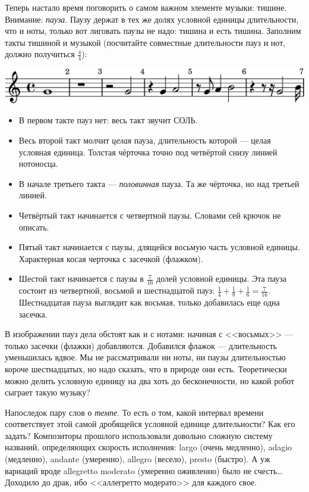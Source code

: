 Теперь настало время поговорить о самом важном элементе музыки: тишине. Внимание: \emph{пауза}. Паузу держат в тех же долях условной единицы длительности, что и ноты, только вот лиговать паузы не надо: тишина и есть тишина. Заполним такты тишиной и музыкой (посчитайте совместные длительности пауз и нот, должно получиться $\frac{4}{4}$): 
\begin{center}
    \includegraphics{fig/notes/pause}
\end{center}
\begin{itemize}
    \item В первом такте пауз нет: весь такт звучит СОЛЬ.
    \item Весь второй такт молчит \emph{целая} пауза, длительность которой --- целая условная единица. Толстая чёрточка точно под четвёртой снизу линией нотоносца.
    \item В начале третьего такта --- \emph{половинная} пауза. Та же чёрточка, но над третьей линией.
    \item Четвёртый такт начинается с четвертной паузы. Словами сей крючок не описать.
    \item Пятый такт начинается с паузы, длящейся восьмую часть условной единицы. Характерная косая черточка с засечкой (флажком).
    \item Шестой такт начинается с паузы в $\frac{7}{16}$ долей условной единицы. Эта пауза состоит из четвертной, восьмой и шестнадцатой пауз: $\frac{1}{4} + \frac{1}{8} + \frac{1}{6} = \frac{7}{16}$. Шестнадцатая пауза выглядит как восьмая, только добавилась еще одна засечка. 
\end{itemize}

В изображении пауз дела обстоят как и с нотами: начиная с <<восьмых>> --- только засечки (флажки) добавляются. Добавился флажок --- длительность уменьшилась вдвое. Мы не рассматривали ни ноты, ни паузы длительностью короче шестнадцатых, но надо сказать, что в природе они есть. Теоретически можно делить условную единицу на два хоть до бесконечности, но какой робот сыграет такую музыку?

Напоследок пару слов о \emph{темпе}. То есть о том, какой интервал времени соответствует этой самой дробящейся условной единице длительности? Как его задать? Композиторы прошлого использовали довольно сложную систему названий, определяющих скорость исполнения: largo (очень медленно), adagio (медленно), andante (умеренно), allegro (весело), presto (быстро). А уж вариаций вроде allegretto moderato (умеренно оживленно) было не счесть\ldots Доходило до драк, ибо <<аллегретто модерато>> для каждого свое. 

